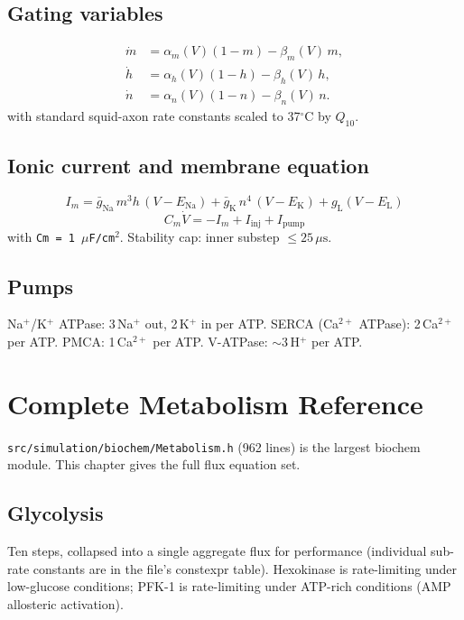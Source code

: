 \documentclass[11pt,letterpaper,twoside,openany]{book}
\newcommand{\code}[1]{\texttt{#1}}
\newcommand{\file}[1]{\texttt{\small#1}}
\begin{document}
\section{Gating variables}

\begin{align}
  \dot m &= \alpha_m(V)(1-m) - \beta_m(V)\,m,\\
  \dot h &= \alpha_h(V)(1-h) - \beta_h(V)\,h,\\
  \dot n &= \alpha_n(V)(1-n) - \beta_n(V)\,n.
\end{align}
with standard squid-axon rate constants scaled to 37$^\circ$C by
$Q_{10}$.

\section{Ionic current and membrane equation}

\begin{equation}
  I_m = \bar g_{\text{Na}}\,m^3 h\,(V - E_{\text{Na}}) + \bar g_{\text{K}}\,n^4\,(V - E_{\text{K}}) + g_{\text{L}}(V - E_{\text{L}})
\end{equation}
\begin{equation}
  C_m \dot V = -I_m + I_{\text{inj}} + I_{\text{pump}}
\end{equation}
with \code{Cm = 1\,\(\mu\)F/cm\(^2\)}. Stability cap: inner substep
$\le 25\,\mu\text{s}$.

\section{Pumps}

Na$^+$/K$^+$ ATPase: 3\,Na$^+$ out, 2\,K$^+$ in per ATP. SERCA
(Ca$^{2+}$ ATPase): 2\,Ca$^{2+}$ per ATP. PMCA: 1\,Ca$^{2+}$ per ATP.
V-ATPase: $\sim$3\,H$^+$ per ATP.

\chapter{Complete Metabolism Reference}
\label{ch:metabolism-deep}

\file{src/simulation/biochem/Metabolism.h} (962 lines) is the
largest biochem module. This chapter gives the full flux equation
set.

\section{Glycolysis}

Ten steps, collapsed into a single aggregate flux for performance
(individual sub-rate constants are in the file's constexpr table).
Hexokinase is rate-limiting under low-glucose conditions; PFK-1 is
rate-limiting under ATP-rich conditions (AMP allosteric activation).
\end{document}

